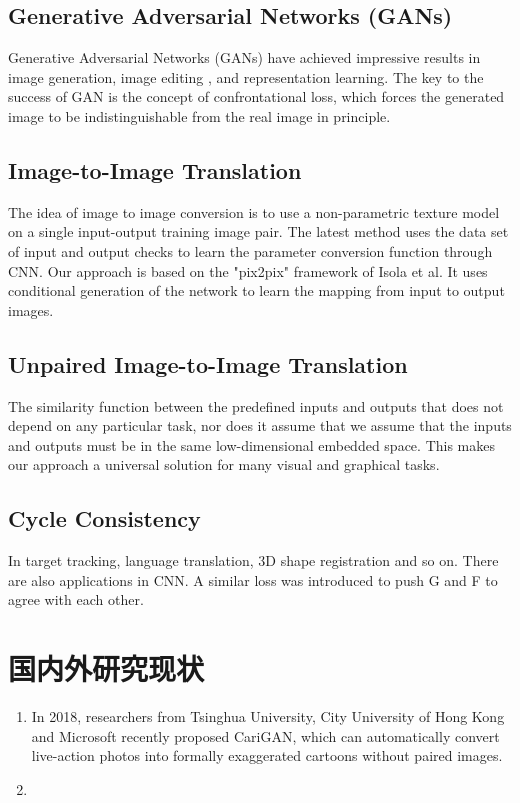 \subsection{\heiti Generative Adversarial Networks (GANs)}
Generative Adversarial Networks (GANs)\cite{GAN,GAN1}
have achieved impressive results in image generation\cite{imagegen,imagegen1},
image editing \cite{imgaeedi}, 
and representation learning\cite{imagegen1,replearn}.
The key to the success of GAN is 
the concept of confrontational loss, 
which forces the generated image to be 
indistinguishable from the real image in principle.

\subsection{\heiti Image-to-Image Translation}
The idea of image to image conversion 
is to use a non-parametric texture model\cite{texmodel}
 on a single input-output training image pair. 
 The latest method uses the data set of 
 input and output checks to learn the 
 parameter conversion function through CNN\cite{CNN}. 
 Our approach is based on the "pix2pix"\cite{pix2pix} 
 framework of Isola et al\cite{Isola}.
 It uses conditional generation of the network 
 to learn the mapping from input to output images.


\subsection{\heiti Unpaired Image-to-Image Translation}
The similarity function between the predefined inputs 
and outputs that does not depend on any particular task, 
nor does it assume that we assume that the inputs 
and outputs must be in the same low-dimensional 
embedded space. This makes our approach a 
universal solution for many visual and graphical tasks.

\subsection{\heiti Cycle Consistency}
In target tracking, language translation, 
3D shape registration and so on. 
There are also applications in CNN. 
A similar loss was introduced to push G and F 
to agree with each other.

\section{\heiti 国内外研究现状}
\begin{enumerate}[（1）] 
	\item In 2018, researchers from Tsinghua University,
	 City University of Hong Kong and Microsoft recently 
	 proposed CariGAN\cite{cGAN}, which can automatically 
	 convert live-action photos into formally 
	 exaggerated cartoons without paired images.
	
	\item 
	
	
\end{enumerate}



